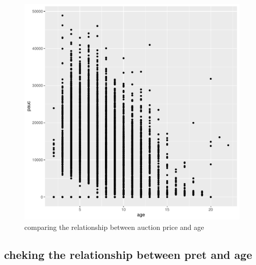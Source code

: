\documentclass[11pt]{paper}
\begin{document}
\begin{figure}[h!]
  \centering
  \includegraphics[scale = 0.5, keepaspectratio=true]{../Figures/pauc_age_plot}
  \caption{comparing the relationship between auction price and age} \label{fig:pauct_age_plot}
\end{figure}


\pagebreak

\subsection{cheking the relationship between pret and age }
\end{document}
